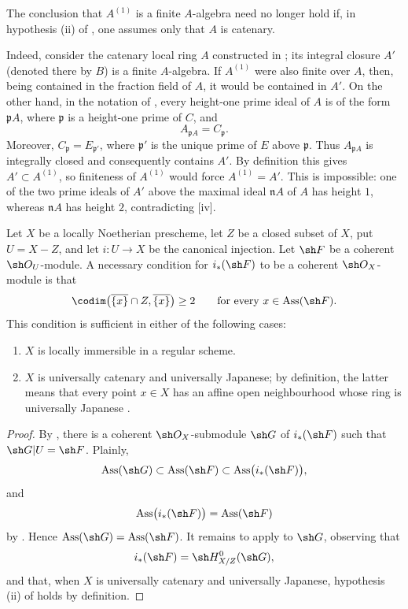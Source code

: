 \begin{remark}[5.11.3]
\label{IV.5.11.3}
The conclusion that $A^{(1)}$ is a finite $A$-algebra need no
longer hold if, in hypothesis {\rm(ii)} of
, one assumes only that $A$ is catenary.

Indeed, consider the catenary local ring $A$ constructed in
; its integral closure $A'$ (denoted there by
$B$) is a finite $A$-algebra.  If $A^{(1)}$ were also finite over
$A$, then, being contained in the fraction field of $A$, it would
be contained in $A'$.  On the other hand, in the notation of
, every height-one prime ideal of $A$ is of the
form $\mathfrak pA$, where $\mathfrak p$ is a height-one prime of
$C$, and
\[
  A_{\mathfrak pA}=C_{\mathfrak p}.
\]
Moreover, $C_{\mathfrak p}=E_{\mathfrak p'}$, where
$\mathfrak p'$ is the unique prime of $E$ above $\mathfrak p$.
Thus $A_{\mathfrak pA}$ is integrally closed and consequently
contains $A'$.  By definition this gives
$A'\subset A^{(1)}$, so finiteness of $A^{(1)}$ would force
$A^{(1)}=A'$.  This is impossible: one of the two prime ideals of
$A'$ above the maximal ideal $\mathfrak nA$ of $A$ has height
$1$, whereas $\mathfrak nA$ has height $2$, contradicting
[iv].
\end{remark}

\begin{corollary}[5.11.4]
\label{IV.5.11.4}
Let $X$ be a locally Noetherian prescheme, let $Z$ be a closed
subset of $X$, put $U=X-Z$, and let $i:U\to X$ be the canonical
injection.  Let $\sh F$ be a coherent $\sh O_U$-module.  A
necessary condition for $i_*(\sh F)$ to be a coherent
$\sh O_X$-module is that
\[
  \codim\bigl(\overline{\{x\}}\cap Z,\overline{\{x\}}\bigr)
  \geq2
  \qquad
  \text{for every }x\in\operatorname{Ass}(\sh F).
\]
This condition is sufficient in either of the following cases:
\begin{enumerate}[{\rm(i)}]
  \item $X$ is locally immersible in a regular scheme.
  \item $X$ is universally catenary and universally Japanese;
  by definition, the latter means that every point $x\in X$ has
  an affine open neighbourhood whose ring is universally
  Japanese .
\end{enumerate}
\end{corollary}

\begin{proof}
By , there is a coherent
$\sh O_X$-submodule $\sh G$ of $i_*(\sh F)$ such that
$\sh G|U=\sh F$.  Plainly,
\[
  \operatorname{Ass}(\sh G)
  \subset\operatorname{Ass}(\sh F)
  \subset\operatorname{Ass}\bigl(i_*(\sh F)\bigr),
\]
and
\[
  \operatorname{Ass}\bigl(i_*(\sh F)\bigr)
  =\operatorname{Ass}(\sh F)
\]
by .  Hence
$\operatorname{Ass}(\sh G)=\operatorname{Ass}(\sh F)$.
It remains to apply  to $\sh G$, observing that
\[
  i_*(\sh F)=\sh H^0_{X/Z}(\sh G),
\]
and that, when $X$ is universally catenary and universally
Japanese, hypothesis {\rm(ii)} of  holds by
definition.
\end{proof}

